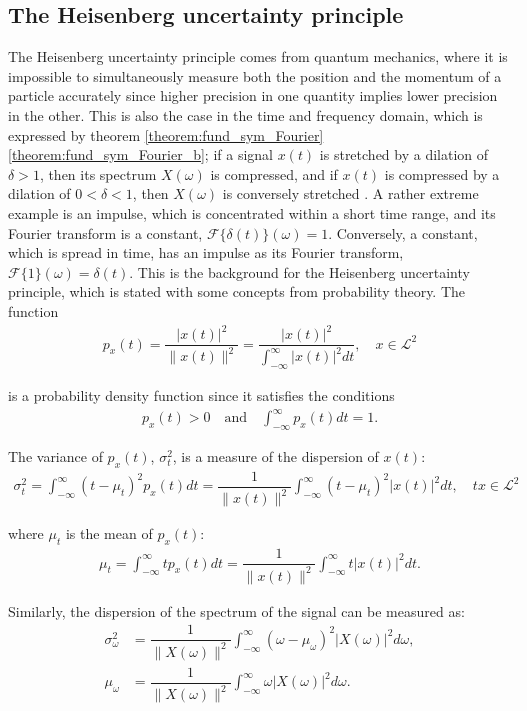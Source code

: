 \subsection{The Heisenberg uncertainty principle}\label{sec:heisenberg}
The Heisenberg uncertainty principle comes from quantum mechanics, where it is impossible to simultaneously measure both the position and the momentum of a particle accurately since higher precision in one quantity implies lower precision in the other. This is also the case in the time and frequency domain, which is expressed by theorem \ref{theorem:fund_sym_Fourier}  \ref{theorem:fund_sym_Fourier_b}; if a signal $x(t)$ is stretched by a dilation of $\delta > 1$, then its spectrum $X(\omega)$ is compressed, and if $x(t)$ is compressed by a dilation of $0 < \delta < 1$, then $X(\omega)$ is conversely stretched \cite{page 123-124, Wang} \cite{page 135, Wang}. A rather extreme example is an impulse, which is concentrated within a short time range, and its Fourier transform is a constant, $\mathcal{F}\{\delta(t)\}(\omega) = 1$. Conversely, a constant, which is spread in time, has an impulse as its Fourier transform, $\mathcal{F}\{1\}(\omega) = \delta(t)$. This is the background for the Heisenberg uncertainty principle, which is stated with some concepts from probability theory. The function 
\begin{align*}
p_x(t) = \dfrac{|x(t)|^2}{\|x(t)\|^2} = \dfrac{|x(t)|^2}{\int_{-\infty}^\infty |x(t)|^2 dt}, \quad x \in \mathcal{L}^2
\end{align*}

is a probability density function since it satisfies the conditions
\begin{align*}
p_x(t) > 0 \quad \text{and} \quad \int_{-\infty}^\infty p_x(t) dt = 1.
\end{align*}

The variance of $p_x(t)$, $\sigma_t^2$, is a measure of the dispersion of $x(t)$:
\begin{align*}
\sigma_t^2 = \int_{-\infty}^\infty (t - \mu_t)^2 p_x(t) dt = \dfrac{1}{\|x(t)\|^2} \int_{-\infty}^\infty (t - \mu_t)^2 |x(t)|^2 dt, \quad tx \in \mathcal{L}^2
\end{align*}

where $\mu_t$ is the mean of $p_x(t)$:
\begin{align*}
\mu_t = \int_{-\infty}^\infty t p_x(t) dt = \dfrac{1}{\|x(t)\|^2} \int_{-\infty}^\infty t |x(t)|^2 dt.
\end{align*}

Similarly, the dispersion of the spectrum of the signal can be measured as:
\begin{align*}
\sigma_\omega^2 &= \dfrac{1}{\|X(\omega)\|^2} \int_{-\infty}^\infty (\omega - \mu_\omega)^2 |X(\omega)|^2 d\omega, \\
\mu_\omega &= \dfrac{1}{\|X(\omega)\|^2} \int_{-\infty}^\infty \omega |X(\omega)|^2 d\omega.
\end{align*}

